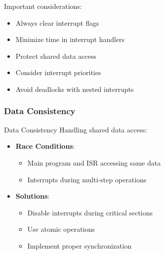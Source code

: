 \begin{remark}
Important considerations:
\begin{itemize}
  \item Always clear interrupt flags
  \item Minimize time in interrupt handlers
  \item Protect shared data access
  \item Consider interrupt priorities
  \item Avoid deadlocks with nested interrupts
\end{itemize}
\end{remark}

\columnbreak

\subsubsection{Data Consistency}

\begin{concept}{Data Consistency}
Handling shared data access:
\begin{itemize}
  \item \textbf{Race Conditions}:
    \begin{itemize}
      \item Main program and ISR accessing same data
      \item Interrupts during multi-step operations
    \end{itemize}
  \item \textbf{Solutions}:
    \begin{itemize}
      \item Disable interrupts during critical sections
      \item Use atomic operations
      \item Implement proper synchronization
    \end{itemize}
\end{itemize}
\end{concept}

